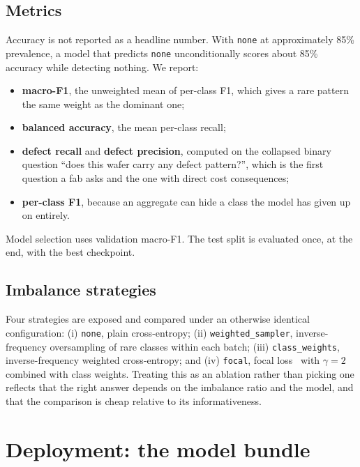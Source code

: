\documentclass[11pt,a4paper]{article}
\begin{document}
\subsection{Metrics}
\label{sec:metrics}

Accuracy is not reported as a headline number. With \texttt{none} at
approximately 85\% prevalence, a model that predicts \texttt{none}
unconditionally scores about 85\% accuracy while detecting nothing. We report:

\begin{itemize}
  \item \textbf{macro-F1}, the unweighted mean of per-class F1, which gives a
    rare pattern the same weight as the dominant one;
  \item \textbf{balanced accuracy}, the mean per-class recall;
  \item \textbf{defect recall} and \textbf{defect precision}, computed on the
    collapsed binary question ``does this wafer carry any defect pattern?'',
    which is the first question a fab asks and the one with direct cost
    consequences;
  \item \textbf{per-class F1}, because an aggregate can hide a class the model
    has given up on entirely.
\end{itemize}

Model selection uses validation macro-F1. The test split is evaluated once, at
the end, with the best checkpoint.

\subsection{Imbalance strategies}
\label{sec:imbalance}

Four strategies are exposed and compared under an otherwise identical
configuration: (i) \texttt{none}, plain cross-entropy; (ii)
\texttt{weighted\_sampler}, inverse-frequency oversampling of rare classes
within each batch; (iii) \texttt{class\_weights}, inverse-frequency weighted
cross-entropy; and (iv) \texttt{focal}, focal loss~\citep{lin2017focal} with
$\gamma=2$ combined with class weights. Treating this as an ablation rather
than picking one reflects that the right answer depends on the imbalance ratio
and the model, and that the comparison is cheap relative to its informativeness.

\section{Deployment: the model bundle}
\label{sec:deployment}
\end{document}
